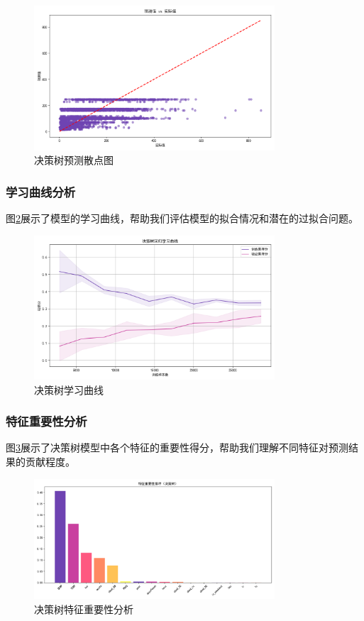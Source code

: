\begin{figure}[H]
    \centering
    \includegraphics[width=0.8\textwidth]{images/decision_tree/prediction_scatter}
    \caption{决策树预测散点图}
    \label{fig:tree_scatter}
\end{figure}

\subsubsection{学习曲线分析}
图\ref{fig:tree_learning}展示了模型的学习曲线，帮助我们评估模型的拟合情况和潜在的过拟合问题。

\begin{figure}[H]
    \centering
    \includegraphics[width=0.8\textwidth]{images/decision_tree/learning_curve}
    \caption{决策树学习曲线}
    \label{fig:tree_learning}
\end{figure}

\subsubsection{特征重要性分析}
图\ref{fig:tree_importance}展示了决策树模型中各个特征的重要性得分，帮助我们理解不同特征对预测结果的贡献程度。

\begin{figure}[H]
    \centering
    \includegraphics[width=0.8\textwidth]{images/decision_tree/feature_importance}
    \caption{决策树特征重要性分析}
    \label{fig:tree_importance}
\end{figure} 